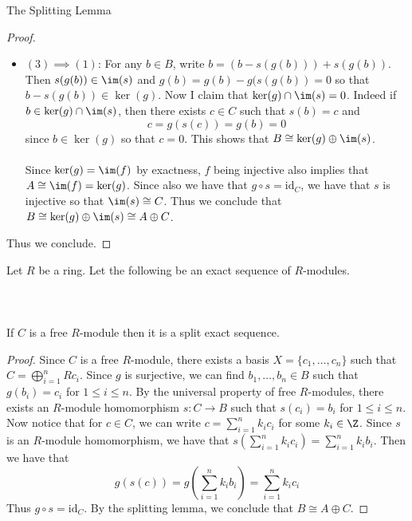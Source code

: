 \documentclass[a4paper]{article}
\begin{document}
\begin{prp}{The Splitting Lemma}{}
\begin{proof}
\begin{itemize}
\item $(3)\implies(1)$: For any $b\in B$, write $b=(b-s(g(b)))+s(g(b))$. Then $s(g(b))\in\im(s)$ and $g(b)=g(b)-g(s(g(b))=0$ so that $b-s(g(b))\in\ker(g)$. Now I claim that $\ker(g)\cap\im(s)=0$. Indeed if $b\in\ker(g)\cap\im(s)$, then there exists $c\in C$ such that $s(b)=c$ and $$c=g(s(c))=g(b)=0$$ since $b\in\ker(g)$ so that $c=0$. This shows that $B\cong\ker(g)\oplus\im(s)$. \\~\\

Since $\ker(g)=\im(f)$ by exactness, $f$ being injective also implies that $A\cong\im(f)=\ker(g)$. Since also we have that $g\circ s=\text{id}_C$, we have that $s$ is injective so that $\im(s)\cong C$. Thus we conclude that $B\cong\ker(g)\oplus\im(s)\cong A\oplus C$. 
\end{itemize}
Thus we conclude. 
\end{proof}
\end{prp}

\begin{prp}{}{} Let $R$ be a ring. Let the following be an exact sequence of $R$-modules. \\~\\
\\~\\
If $C$ is a free $R$-module then it is a split exact sequence. 
\begin{proof}
Since $C$ is a free $R$-module, there exists a basis $X=\{c_1,\dots,c_n\}$ such that $C=\bigoplus_{i=1}^nRc_i$. Since $g$ is surjective, we can find $b_1,\dots,b_n\in B$ such that $g(b_i)=c_i$ for $1\leq i\leq n$. By the universal property of free $R$-modules, there exists an $R$-module homomorphism $s:C\to B$ such that $s(c_i)=b_i$ for $1\leq i\leq n$. Now notice that for $c\in C$, we can write $c=\sum_{i=1}^nk_ic_i$ for some $k_i\in\Z$. Since $s$ is an $R$-module homomorphism, we have that $s\left(\sum_{i=1}^nk_ic_i\right)=\sum_{i=1}^nk_ib_i$. Then we have that $$g(s(c))=g\left(\sum_{i=1}^nk_ib_i\right)=\sum_{i=1}^nk_ic_i$$ Thus $g\circ s=\text{id}_C$. By the splitting lemma, we conclude that $B\cong A\oplus C$. 
\end{proof}
\end{prp}

\pagebreak
\end{document}
